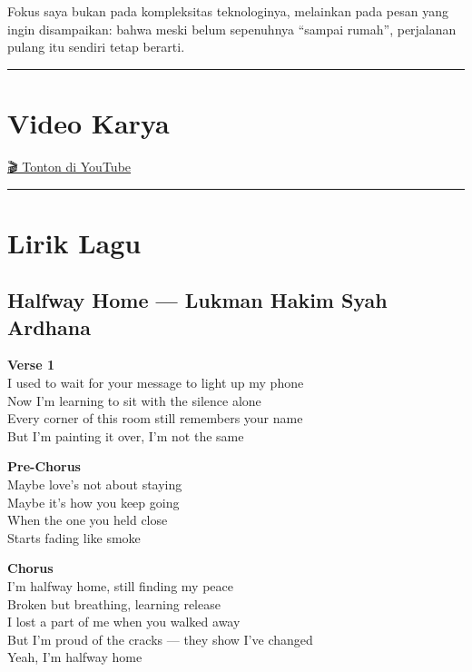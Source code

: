 \documentclass[
  letterpaper,
  DIV=11,
  numbers=noendperiod]{scrreprt}
\begin{document}
Fokus saya bukan pada kompleksitas teknologinya, melainkan pada pesan
yang ingin disampaikan: bahwa meski belum sepenuhnya ``sampai rumah'',
perjalanan pulang itu sendiri tetap berarti.

\begin{center}\rule{0.5\linewidth}{0.5pt}\end{center}

\section{Video Karya}\label{video-karya}

\href{https://youtu.be/qKywgE79b1Q}{🎬 Tonton di YouTube}

\begin{center}\rule{0.5\linewidth}{0.5pt}\end{center}

\section{Lirik Lagu}\label{lirik-lagu}

\subsection{\texorpdfstring{\textbf{Halfway Home --- Lukman Hakim Syah
Ardhana}}{Halfway Home --- Lukman Hakim Syah Ardhana}}\label{halfway-home-lukman-hakim-syah-ardhana}

\textbf{Verse 1}\\
I used to wait for your message to light up my phone\\
Now I'm learning to sit with the silence alone\\
Every corner of this room still remembers your name\\
But I'm painting it over, I'm not the same

\textbf{Pre-Chorus}\\
Maybe love's not about staying\\
Maybe it's how you keep going\\
When the one you held close\\
Starts fading like smoke

\textbf{Chorus}\\
I'm halfway home, still finding my peace\\
Broken but breathing, learning release\\
I lost a part of me when you walked away\\
But I'm proud of the cracks --- they show I've changed\\
Yeah, I'm halfway home
\end{document}
